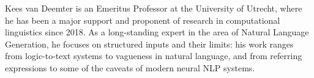 Kees van Deemter is an Emeritus Professor at the University of Utrecht, where he has been a major support and proponent of research in computational linguistics since 2018.
As a long-standing expert in the area of Natural Language Generation, he focuses on structured inputs and their limits: his work ranges from logic-to-text systems to vagueness in natural language, and from referring expressions to some of the caveats of modern neural NLP systems.

